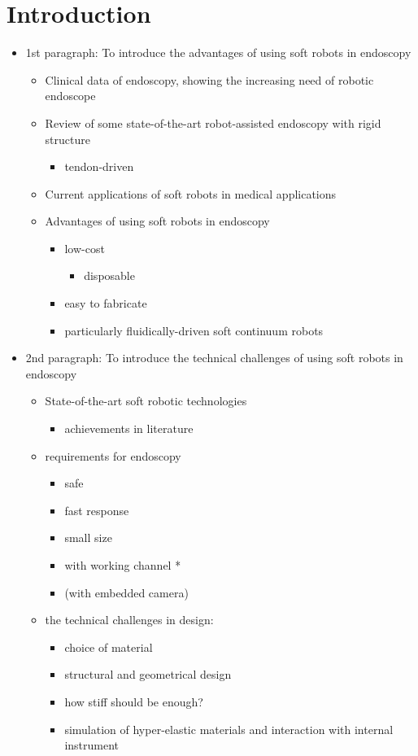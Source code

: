\documentclass[journal,onecolumn]{IEEEtran}
\begin{document}
\section{Introduction}
\label{sec:orgf3c504f}
\begin{itemize}
\item 1st paragraph: To introduce the advantages of using soft robots in endoscopy
\begin{itemize}
\item Clinical data of endoscopy, showing the increasing need of robotic endoscope
\item Review of some state-of-the-art robot-assisted endoscopy with rigid structure
\begin{itemize}
\item tendon-driven
\end{itemize}
\item Current applications of soft robots in medical applications
\item Advantages of using soft robots in endoscopy
\begin{itemize}
\item low-cost 
\begin{itemize}
\item disposable
\end{itemize}
\item easy to fabricate
\item particularly fluidically-driven soft continuum robots
\end{itemize}
\end{itemize}

\item 2nd paragraph: To introduce the technical challenges of using soft robots in endoscopy
\begin{itemize}
\item State-of-the-art soft robotic technologies
\begin{itemize}
\item achievements in literature
\end{itemize}
\item requirements for endoscopy
\begin{itemize}
\item safe
\item fast response
\item small size
\item with working channel *
\item (with embedded camera)
\end{itemize}
\item the technical challenges in design:
\begin{itemize}
\item choice of material
\item structural and geometrical design
\item how stiff should be enough?
\item simulation of hyper-elastic materials and interaction with internal instrument
\end{itemize}
\end{itemize}


\end{itemize}
\end{document}
